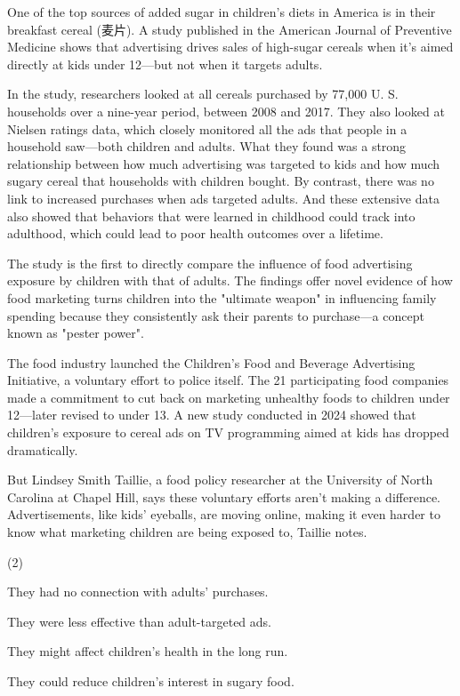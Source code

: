 \documentclass{英语试卷}
\begin{document}
\par One of the top sources of added sugar in children's diets in America is in their breakfast cereal (麦片). A study published in the American Journal of Preventive Medicine shows that advertising drives sales of high-sugar cereals when it's aimed directly at kids under 12—but not when it targets adults.\par
\par In the study, researchers looked at all cereals purchased by 77,000 U. S. households over a nine-year period, between 2008 and 2017. They also looked at Nielsen ratings data, which closely monitored all the ads that people in a household saw—both children and adults. What they found was a strong relationship between how much advertising was targeted to kids and how much sugary cereal that households with children bought. By contrast, there was no link to increased purchases when ads targeted adults. And these extensive data also showed that behaviors that were learned in childhood could track into adulthood, which could lead to poor health outcomes over a lifetime.\par
\par The study is the first to directly compare the influence of food advertising exposure by children with that of adults. The findings offer novel evidence of how food marketing turns children into the "ultimate weapon" in influencing family spending because they consistently ask their parents to purchase—a concept known as "pester power".\par
\par The food industry launched the Children's Food and Beverage Advertising Initiative, a voluntary effort to police itself. The 21 participating food companies made a commitment to cut back on marketing unhealthy foods to children under 12—later revised to under 13. A new study conducted in 2024 showed that children's exposure to cereal ads on TV programming aimed at kids has dropped dramatically.\par
\par But Lindsey Smith Taillie, a food policy researcher at the University of North Carolina at Chapel Hill, says these voluntary efforts aren't making a difference. Advertisements, like kids' eyeballs, are moving online, making it even harder to know what marketing children are being exposed to, Taillie notes.\par
{}
\begin{choices}(2)
  \item They had no connection with adults' purchases.
  \item They were less effective than adult-targeted ads.
  \item They might affect children's health in the long run.
  \item They could reduce children's interest in sugary food.
\end{choices}
\end{document}
